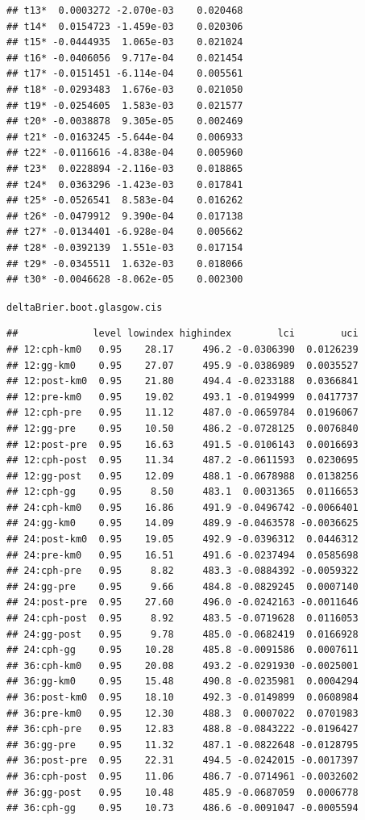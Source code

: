 \documentclass{article}\usepackage[]{graphicx}\usepackage[]{color}
\makeatletter
\newcommand{\hlstd}[1]{\textcolor[rgb]{0.345,0.345,0.345}{#1}}%
\newenvironment{kframe}{%
 \def\at@end@of@kframe{}%
 \ifinner\ifhmode%
  \def\at@end@of@kframe{\end{minipage}}%
  \begin{minipage}{\columnwidth}%
 \fi\fi%
 \def\FrameCommand##1{\hskip\@totalleftmargin \hskip-\fboxsep
 \colorbox{shadecolor}{##1}\hskip-\fboxsep
     \hskip-\linewidth \hskip-\@totalleftmargin \hskip\columnwidth}%
 \MakeFramed {\advance\hsize-\width
   \@totalleftmargin\z@ \linewidth\hsize
   \@setminipage}}%
 {\par\unskip\endMakeFramed%
 \at@end@of@kframe}
\newenvironment{knitrout}{}{} %
\makeatother
\begin{document}
\begin{knitrout}
\begin{kframe}
\begin{verbatim}
## t13*  0.0003272 -2.070e-03    0.020468
## t14*  0.0154723 -1.459e-03    0.020306
## t15* -0.0444935  1.065e-03    0.021024
## t16* -0.0406056  9.717e-04    0.021454
## t17* -0.0151451 -6.114e-04    0.005561
## t18* -0.0293483  1.676e-03    0.021050
## t19* -0.0254605  1.583e-03    0.021577
## t20* -0.0038878  9.305e-05    0.002469
## t21* -0.0163245 -5.644e-04    0.006933
## t22* -0.0116616 -4.838e-04    0.005960
## t23*  0.0228894 -2.116e-03    0.018865
## t24*  0.0363296 -1.423e-03    0.017841
## t25* -0.0526541  8.583e-04    0.016262
## t26* -0.0479912  9.390e-04    0.017138
## t27* -0.0134401 -6.928e-04    0.005662
## t28* -0.0392139  1.551e-03    0.017154
## t29* -0.0345511  1.632e-03    0.018066
## t30* -0.0046628 -8.062e-05    0.002300
\end{verbatim}
\begin{alltt}
\hlstd{deltaBrier.boot.glasgow.cis}
\end{alltt}
\begin{verbatim}
##             level lowindex highindex        lci        uci
## 12:cph-km0   0.95    28.17     496.2 -0.0306390  0.0126239
## 12:gg-km0    0.95    27.07     495.9 -0.0386989  0.0035527
## 12:post-km0  0.95    21.80     494.4 -0.0233188  0.0366841
## 12:pre-km0   0.95    19.02     493.1 -0.0194999  0.0417737
## 12:cph-pre   0.95    11.12     487.0 -0.0659784  0.0196067
## 12:gg-pre    0.95    10.50     486.2 -0.0728125  0.0076840
## 12:post-pre  0.95    16.63     491.5 -0.0106143  0.0016693
## 12:cph-post  0.95    11.34     487.2 -0.0611593  0.0230695
## 12:gg-post   0.95    12.09     488.1 -0.0678988  0.0138256
## 12:cph-gg    0.95     8.50     483.1  0.0031365  0.0116653
## 24:cph-km0   0.95    16.86     491.9 -0.0496742 -0.0066401
## 24:gg-km0    0.95    14.09     489.9 -0.0463578 -0.0036625
## 24:post-km0  0.95    19.05     492.9 -0.0396312  0.0446312
## 24:pre-km0   0.95    16.51     491.6 -0.0237494  0.0585698
## 24:cph-pre   0.95     8.82     483.3 -0.0884392 -0.0059322
## 24:gg-pre    0.95     9.66     484.8 -0.0829245  0.0007140
## 24:post-pre  0.95    27.60     496.0 -0.0242163 -0.0011646
## 24:cph-post  0.95     8.92     483.5 -0.0719628  0.0116053
## 24:gg-post   0.95     9.78     485.0 -0.0682419  0.0166928
## 24:cph-gg    0.95    10.28     485.8 -0.0091586  0.0007611
## 36:cph-km0   0.95    20.08     493.2 -0.0291930 -0.0025001
## 36:gg-km0    0.95    15.48     490.8 -0.0235981  0.0004294
## 36:post-km0  0.95    18.10     492.3 -0.0149899  0.0608984
## 36:pre-km0   0.95    12.30     488.3  0.0007022  0.0701983
## 36:cph-pre   0.95    12.83     488.8 -0.0843222 -0.0196427
## 36:gg-pre    0.95    11.32     487.1 -0.0822648 -0.0128795
## 36:post-pre  0.95    22.31     494.5 -0.0242015 -0.0017397
## 36:cph-post  0.95    11.06     486.7 -0.0714961 -0.0032602
## 36:gg-post   0.95    10.48     485.9 -0.0687059  0.0006778
## 36:cph-gg    0.95    10.73     486.6 -0.0091047 -0.0005594
\end{verbatim}
\end{kframe}
\end{knitrout}
\end{document}

